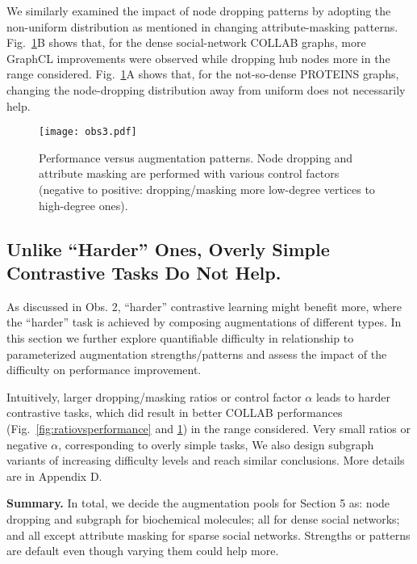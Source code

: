 We similarly examined the impact of node dropping patterns by adopting the non-uniform distribution as mentioned in changing attribute-masking patterns.  Fig.~\ref{fig:controlratiovsperformance}B shows that, for the dense social-network COLLAB graphs, more GraphCL improvements were observed while dropping hub nodes more in the range considered.  Fig.~\ref{fig:controlratiovsperformance}A shows that, for the not-so-dense PROTEINS graphs, changing the node-dropping distribution away from uniform does not necessarily help.  

\begin{figure}[ht] 
    \centering 
    \texttt{[image: obs3.pdf]}
    \caption{\small{Performance versus augmentation patterns. Node dropping and  attribute masking are performed with various control factors (negative to positive: dropping/masking more low-degree vertices to high-degree ones).}}
    \label{fig:controlratiovsperformance} 
\end{figure} %

\vspace{-1em}
\subsection{Unlike ``Harder'' Ones, Overly Simple Contrastive Tasks Do Not Help.}
\label{sec:over_simple}
As discussed in Obs. 2, ``harder'' contrastive learning might benefit more, where the ``harder'' task is achieved by composing augmentations of different types.  
In this section we further explore quantifiable difficulty in relationship to parameterized augmentation strengths/patterns and assess the impact of the difficulty on performance improvement.  

Intuitively, larger  dropping/masking ratios or control factor $\alpha$ leads to harder contrastive tasks, which did result in better COLLAB performances (Fig.~\ref{fig:ratiovsperformance} and \ref{fig:controlratiovsperformance}) in the range considered.  Very small ratios or negative $\alpha$, corresponding to overly simple tasks, We also design subgraph variants of increasing difficulty levels and reach similar conclusions. More details are in Appendix D.

\textbf{Summary.} In total, we decide the augmentation pools for Section 5 as: node dropping and subgraph for biochemical molecules; all for dense social networks; and all except attribute masking for sparse social networks. Strengths or patterns are default even though varying them could help more.  

